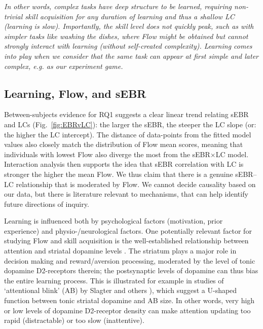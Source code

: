 \documentclass[10pt,letterpaper,floatsintext]{article}
\begin{document}
{\it In other words, complex tasks have deep structure to be learned, requiring non-trivial skill acquisition for any duration of learning and thus a shallow LC (learning is slow). Importantly, the skill level does not quickly peak, such as with simpler tasks like washing the dishes, where Flow might be obtained but cannot strongly interact with learning (without self-created complexity). Learning comes into play when we consider that the same task can appear at first simple and later complex, e.g. as our experiment game.}

\subsection*{Learning, Flow, and sEBR}
Between-subjects evidence for RQ1 suggests a clear linear trend relating sEBR and LCs (Fig.~\ref{fig:EBRvLC}): the larger the sEBR, the steeper the LC slope (or: the higher the LC intercept). The distance of data-points from the fitted model values also closely match the distribution of Flow mean scores, meaning that individuals with lowest Flow also diverge the most from the sEBR$\times$LC model. Interaction analysis then supports the idea that sEBR correlation with LC is stronger the higher the mean Flow. We thus claim that there is a genuine sEBR--LC relationship that is moderated by Flow. We cannot decide causality based on our data, but there is literature relevant to mechanisms, that can help identify future directions of inquiry.

Learning is influenced both by psychological factors (motivation, prior experience) and physio-/neurological factors. One potentially relevant factor for studying Flow and skill acquisition is the well-established relationship between attention and striatal dopamine levels \cite{Dreisbach2005}. The striatum plays a major role in decision making and reward/aversion processing, moderated by the level of tonic dopamine D2-receptors therein; the postsynaptic levels of dopamine can thus bias the entire learning process. This is illustrated for example in studies of `attentional blink' (AB) by Slagter and others \cite{Slagter2012,COLZATO2008}), which suggest a U-shaped function between tonic striatal dopamine and AB size. In other words, very high or low levels of dopamine D2-receptor density can make attention updating too rapid (distractable) or too slow (inattentive).
\end{document}
